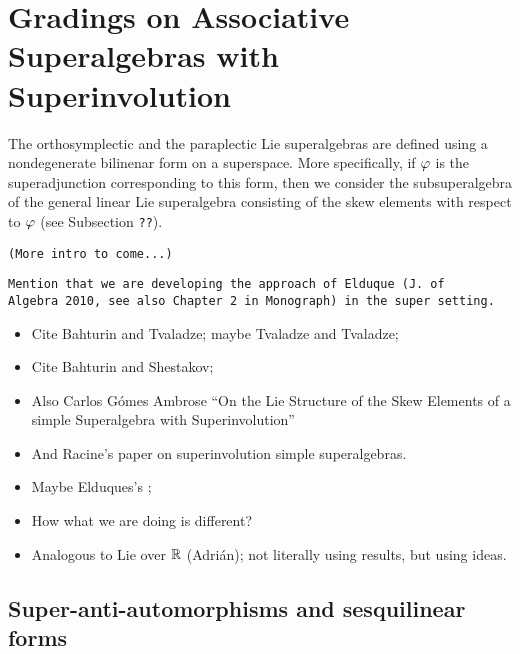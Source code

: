 % 


\chapter{Gradings on Associative Superalgebras with Superinvolution}\label{chap:super-inv}

The orthosymplectic and the paraplectic Lie superalgebras are defined using a nondegenerate bilinenar form on a superspace. 
More specifically, if $\varphi$ is the superadjunction corresponding to this form, then we consider the subsuperalgebra of the general linear Lie superalgebra consisting of the skew elements with respect to $\varphi$ (see Subsection {\tt ??}). 

\vspace{5mm}
{\tt (More intro to come...)}


{\tt Mention that we are developing the approach of Elduque (J. of \\Al\-ge\-bra 2010, see also Chapter 2 in Monograph) in the super setting.}

\begin{itemize}
    \item Cite Bahturin and Tvaladze; maybe Tvaladze and Tvaladze;
    \item Cite Bahturin and Shestakov;
    \item Also Carlos G\'omes Ambrose ``On the Lie Structure of the Skew Elements of a simple Superalgebra with Superinvolution''
    \item And Racine's paper on superinvolution simple superalgebras.
    \item Maybe Elduques's \cite{elduqueSuperinv};
    \item How what we are doing is different?
    \item Analogous to Lie over $\mathbb{R}$ (Adri\'an); not literally using results, but using ideas.
\end{itemize}


\section{Super-anti-automorphisms and ses\-qui\-li\-near\\ forms}\label{sec:super-anti-auto-and-sesquilinear}

